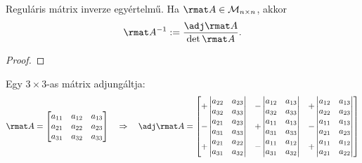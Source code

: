 \begin{statement}
  Reguláris mátrix inverze egyértelmű. Ha $\rmat A \in \mathcal M_{n \times n}$,
  akkor
  $$
    \rmat A^{-1} := \frac{\adj \rmat A}{\det \rmat A}
    \text.
  $$

  \begin{proof}
    \vspace{6em}
  \end{proof}
\end{statement}

\begin{blueBox}
  Egy $3 \times 3$-as mátrix adjungáltja:
  $$
    \rmat A = \begin{bmatrix}
      a_{11} & a_{12} & a_{13} \\
      a_{21} & a_{22} & a_{23} \\
      a_{31} & a_{32} & a_{33}
    \end{bmatrix}
    \quad
    \Rightarrow
    \quad
    \adj \rmat A = \begin{bmatrix}
      + \begin{vmatrix}
          a_{22} & a_{23} \\
          a_{32} & a_{33}
        \end{vmatrix}
       &
      - \begin{vmatrix}
          a_{12} & a_{13} \\
          a_{32} & a_{33}
        \end{vmatrix}
       &
      +\begin{vmatrix}
         a_{12} & a_{13} \\
         a_{22} & a_{23}
       \end{vmatrix}
      \\
      - \begin{vmatrix}
          a_{21} & a_{23} \\
          a_{31} & a_{33}
        \end{vmatrix}
       &
      + \begin{vmatrix}
          a_{11} & a_{13} \\
          a_{31} & a_{33}
        \end{vmatrix}
       &
      - \begin{vmatrix}
          a_{11} & a_{13} \\
          a_{21} & a_{23}
        \end{vmatrix}
      \\
      + \begin{vmatrix}
          a_{21} & a_{22} \\
          a_{31} & a_{32}
        \end{vmatrix}
       &
      - \begin{vmatrix}
          a_{11} & a_{12} \\
          a_{31} & a_{32}
        \end{vmatrix}
       &
      +\begin{vmatrix}
         a_{11} & a_{12} \\
         a_{21} & a_{22}
       \end{vmatrix}
    \end{bmatrix}
  $$
\end{blueBox}